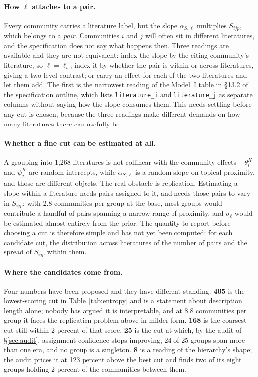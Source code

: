 \documentclass[11pt]{article}
\newcommand{\code}[1]{\texttt{\small #1}}
\begin{document}
\paragraph{How $\ell$ attaches to a pair.} Every community carries a
literature label, but the slope $\alpha_{S,\ell}$ multiplies $S_{ijp}$, which
belongs to a \emph{pair}. Communities $i$ and $j$ will often sit in different
literatures, and the specification does not say what happens then. Three
readings are available and they are not equivalent: index the slope by the
citing community's literature, so $\ell = \ell_i$; index it by whether the pair
is within or across literatures, giving a two-level contrast; or carry an
effect for each of the two literatures and let them add. The first is the narrowest reading of the Model~I table in \S13.2 of the
specification outline, which lists \code{literature_i} and
\code{literature_j} as separate columns without saying how the slope consumes
them. This needs settling before any cut is chosen, because the three readings
make different demands on how many literatures there can usefully be.

\paragraph{Whether a fine cut can be estimated at all.} A grouping into 1{,}268
literatures is not collinear with the community effects -- $\theta^{K}_{i}$ and
$\psi^{K}_{j}$ are random intercepts, while $\alpha_{S,\ell}$ is a random slope
on topical proximity, and those are different objects. The real obstacle is
replication. Estimating a slope within a literature needs pairs assigned to it,
and needs those pairs to vary in $S_{ijp}$; with 2.8 communities per group at
the base, most groups would contribute a handful of pairs spanning a narrow
range of proximity, and $\sigma_{\ell}$ would be estimated almost entirely from
the prior. The quantity to report before choosing a cut is therefore simple and
has not yet been computed: for each candidate cut, the distribution across
literatures of the number of pairs and the spread of $S_{ijp}$ within them.

\paragraph{Where the candidates come from.} Four numbers have been proposed
and they have different standing. \textbf{405} is the lowest-scoring cut in
Table~\ref{tab:entropy} and is a statement about description length alone;
nobody has argued it is interpretable, and at 8.8 communities per group it
faces the replication problem above in milder form. \textbf{168} is the
coarsest cut still within 2 percent of that score. \textbf{25} is the cut at
which, by the audit of \S\ref{sec:audit}, assignment confidence stops
improving, 24 of 25 groups span more than one era, and no group is a
singleton. \textbf{8} is a reading of the hierarchy's shape; the audit prices
it at 123 percent above the best cut and finds two of its eight groups holding
2 percent of the communities between them.
\end{document}
